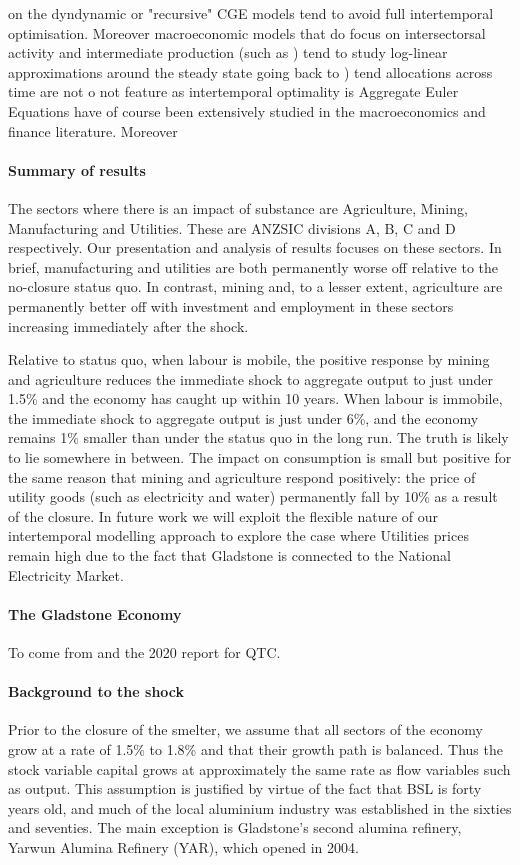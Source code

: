 \documentclass[12pt,a4paper]{article}
\begin{document}
on the dyndynamic or
"recursive" CGE models tend to avoid full intertemporal optimisation. Moreover
macroeconomic models that do focus on intersectorsal activity and intermediate
production (such as \cite{Atalay}) tend to study log-linear approximations
around the steady state  going back to \cite{Long and Plosser}) tend
allocations across time are not o not feature as intertemporal optimality is
Aggregate Euler Equations have of course been extensively studied in the
macroeconomics and finance literature. Moreover

\paragraph{Summary of results} The sectors where there is an impact of
substance are Agriculture, Mining, Manufacturing and Utilities. These are
ANZSIC divisions A, B, C and D respectively. Our presentation and analysis of
results focuses on these sectors.  In brief, manufacturing and utilities are
both permanently worse off relative to the no-closure status quo.  In contrast,
mining and, to a lesser extent, agriculture are permanently better off with
investment and employment in these sectors increasing immediately after the
shock.

Relative to status quo, when labour is mobile, the positive response by mining
and agriculture reduces the immediate shock to aggregate output to just under
1.5\% and the economy has caught up within 10 years.  When labour is immobile,
the immediate shock to aggregate output is just under 6\%, and the economy
remains 1\% smaller than under the status quo in the long run. The truth is
likely to lie somewhere in between. The impact on consumption is small but
positive for the same reason that mining and agriculture respond positively:
the price of utility goods (such as electricity and water) permanently fall by
10\% as a result of the closure. In future work we will exploit the flexible
nature of our intertemporal modelling approach to explore the case where
Utilities prices remain high due to the fact that Gladstone is connected to the
National Electricity Market.

\paragraph{The Gladstone Economy} To come from \cite{glad-prospectus} and
the 2020 report for QTC.

\paragraph{Background to the shock} Prior to the closure of the smelter, we
assume that all sectors of the economy grow at a rate of 1.5\% to 1.8\% and
that their growth path is balanced. Thus the stock variable capital grows at
approximately the same rate as flow variables such as output.  This assumption
is justified by virtue of the fact that BSL is forty years old, and much of the
local aluminium industry was established in the sixties and seventies.  The
main exception is Gladstone's second alumina refinery, Yarwun Alumina Refinery
(YAR), which opened in 2004.
\end{document}
